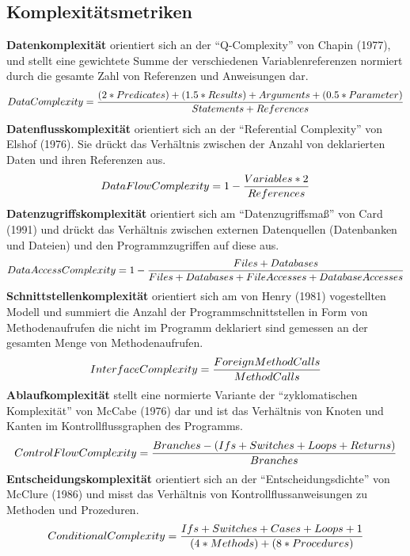 \documentclass[gb,ngerman]{stthesis}
\begin{document}
		\subsection{Komplexitätsmetriken}
			\textbf{Datenkomplexität} orientiert sich an der "`Q-Complexity"' von Chapin (1977), und stellt eine gewichtete Summe der verschiedenen Variablenreferenzen normiert durch die gesamte Zahl von Referenzen und Anweisungen dar.
			\begin{equation}
				\small{Data Complexity = \dfrac{(2 * Predicates) + (1.5 * Results) + Arguments + (0.5 * Parameter)}{Statements + References}} 
			\end{equation}
			\textbf{Datenflusskomplexität} orientiert sich an der "`Referential Complexity"' von Elshof (1976). Sie drückt das Verhältnis zwischen der Anzahl von deklarierten Daten und ihren Referenzen aus. 
			\begin{equation}
				\small{Data Flow Complexity = 1 - \dfrac{Variables * 2}{References}} 
			\end{equation}
			\textbf{Datenzugriffskomplexität} orientiert sich am "`Datenzugriffsmaß"' von Card (1991) und drückt das Verhältnis zwischen externen Datenquellen (Datenbanken und Dateien) und den Programmzugriffen auf diese aus.
			\begin{equation}
				\small{Data Access Complexity = 1 - \dfrac{Files + Databases}{Files + Databases + FileAccesses + DatabaseAccesses}} 
			\end{equation}
			\textbf{Schnittstellenkomplexität} orientiert sich am von Henry (1981) vogestellten Modell und summiert die Anzahl der Programmschnittstellen in Form von Methodenaufrufen die nicht im Programm deklariert sind gemessen an der gesamten Menge von Methodenaufrufen.
			\begin{equation}
				\small{Interface Complexity = \dfrac{ForeignMethodCalls}{MethodCalls}} 
			\end{equation}
			\textbf{Ablaufkomplexität} stellt eine normierte Variante der "`zyklomatischen Komplexität"' von McCabe (1976) dar und ist das Verhältnis von Knoten und Kanten im Kontrollflussgraphen des Programms.
			\begin{equation}
				\small{Control Flow Complexity = \dfrac{Branches - (Ifs + Switches + Loops + Returns)}{Branches}} 
			\end{equation}
			\textbf{Entscheidungskomplexität} orientiert sich an der "`Entscheidungsdichte"' von McClure (1986) und misst das Verhältnis von Kontrollflussanweisungen zu Methoden und Prozeduren.
			\begin{equation}
				\small{Conditional Complexity = \dfrac{Ifs + Switches + Cases + Loops + 1}{(4 * Methods) + (8 * Procedures)}} 
			\end{equation}
\end{document}

